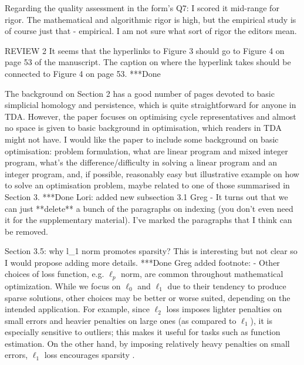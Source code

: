 \documentclass{article}
\begin{document}
Regarding the quality assessment in the form's Q7: I scored it
mid-range for rigor. The mathematical and algorithmic rigor is high, but the empirical study is of course just that - empirical. I am not sure what sort of rigor the editors mean.





REVIEW 2
It seems that the hyperlinks to Figure 3 should go to Figure 4 on page 53 of the manuscript. The caption on where the hyperlink takes should be connected to Figure 4 on page 53.
***Done


The background on Section 2 has a good number of pages devoted to basic simplicial homology and persistence, which is quite straightforward for anyone in TDA. However, the paper focuses on optimising cycle representatives and almost no space is given to basic background in optimisation, which readers in TDA might not have. I would like the paper to include some background on basic optimisation: problem formulation, what are linear program and mixed integer program, what's the difference/difficulty in solving a linear program and an integer program, and, if possible, reasonably easy but illustrative example on how to solve an optimisation problem, maybe related to one of those summarised in Section 3.
***Done
    Lori: added new subsection 3.1
    Greg 
    - It turns out that we can just **delete** a bunch of the paragraphs on indexing (you don't even need it for the supplementary material).  I've marked the paragraphs that I think can be removed.
    

Section 3.5: why l_1 norm promotes sparsity? This is interesting but not clear so I would propose adding more details.
    ***Done 
    Greg 
    added footnote:
    - Other choices of loss function, e.g. $\ell_p$ norm, are common throughout mathematical optimization.  While we focus on $\ell_0$ and $\ell_1$ due to their tendency to produce sparse solutions, other choices may be better or worse suited, depending on the intended application.  For example, since $\ell_2$ loss  imposes lighter penalties on small errors and heavier penalties on large ones (as compared to $\ell_1$), it is especially sensitive to outliers; this makes it useful for tasks such as function estimation.  On the other hand, by imposing relatively heavy penalties on small errors, $\ell_1$ loss encourages sparsity \cite{dohono,NPhardL0}.
\end{document}
